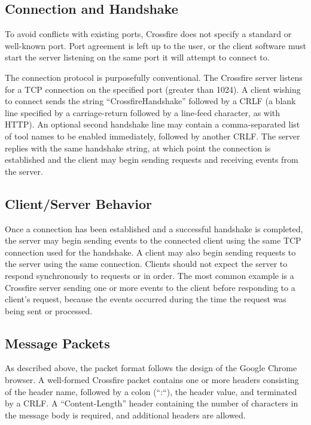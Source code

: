 \subsection {Connection and Handshake}
To avoid conflicts with existing ports,
Crossfire does not specify a standard or well-known port. Port agreement is left
up to the user, or the client software must start the server listening on
the same port it will attempt to connect to.

The connection protocol is purposefully conventional.
The Crossfire server listens for a TCP connection on the specified port (greater
than 1024).  A client wishing to connect sends the string ``CrossfireHandshake''
followed by a CRLF (a blank line specified by a carriage-return followed by a
line-feed character, as with HTTP). An optional second handshake line may
contain a comma-separated list of tool names to be enabled immediately, followed
by another CRLF. The server replies with the same handshake string, at which
point the connection is established and the client may begin sending requests and
receiving events from the server.

\subsection {Client/Server Behavior}
Once a connection has been established and a successful handshake is completed,
the server may begin sending events to the connected client using the same TCP
connection used for the handshake. A client may also begin sending requests to
the server using the same connection. Clients should not expect the server to
respond synchronously to requests or in order. The most common example is a
Crossfire server sending one or more events to the client before responding to a
client's request, because the events occurred during the time the request was
being sent or processed.

\subsection {Message Packets}
As described above, the packet format follows the design of the Google Chrome browser\cite{V8}.
A well-formed Crossfire packet contains one or more headers consisting of the
header name, followed by a colon (``:``), the header value, and terminated by a
CRLF. A ``Content-Length'' header containing the number of characters in the
message body is required, and additional headers are allowed.


